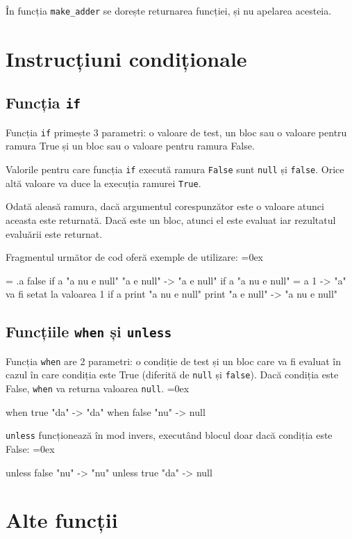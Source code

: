\documentclass[12pt,a4paper]{memoir}
\renewcommand{\c}{\texttt}
\newenvironment{code}
{
\definecolor{shadecolor}{gray}{0.91}
\topsep=0ex
\relax
\shaded
\verbatim
}
{
\endverbatim
\endshaded
}
\begin{document}
În funcția \c{make\_adder} se dorește returnarea funcției, și nu apelarea acesteia.

\section{Instrucțiuni condiționale}

\subsection{Funcția \c{if}}

Funcția \c{if} primește 3 parametri: o valoare de test, un bloc sau o valoare pentru ramura True și un bloc sau o valoare pentru ramura False. 

Valorile pentru care funcția \c{if} execută ramura \c{False} sunt \c{null} și \c{false}. Orice altă valoare va duce la execuția ramurei \c{True}.

Odată aleasă ramura, dacă argumentul corespunzător este o valoare atunci aceasta este returnată. Dacă este un bloc, atunci el este evaluat iar rezultatul evaluării este returnat.

Fragmentul următor de cod oferă exemple de utilizare:
\begin{code}
= .a false
if a "a nu e null" "a e null"
  -> "a e null"
if a "a nu e null" { = a 1 }
  -> "a" va fi setat la valoarea 1
if a { print "a nu e null" } { print "a e null" }
  -> "a nu e null"
\end{code}

\subsection{Funcțiile \c{when} și \c{unless}}

Funcția \c{when} are 2 parametri: o condiție de test și un bloc care va fi evaluat în cazul în care condiția este True (diferită de \c{null} și \c{false}). Dacă condiția este False, \c{when} va returna valoarea \c{null}.
\begin{code}
when true { "da" }
  -> "da"
when false { "nu" }
  -> null
\end{code}

\c{unless} funcționează în mod invers, executând blocul doar dacă condiția este False:
\begin{code}
unless false { "nu" }
  -> "nu"
unless true { "da" }
  -> null
\end{code}

\section{Alte funcții}
\end{document}

